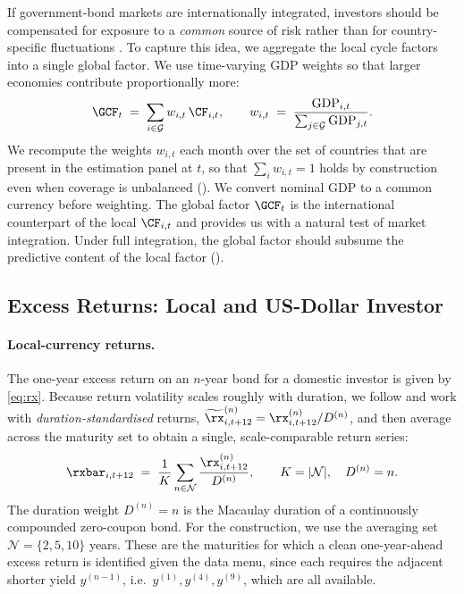 If government-bond markets are internationally integrated, investors should be
compensated for exposure to a \emph{common} source of risk rather than for
country-specific fluctuations \citep{dahlquist2013}. To capture this idea, we
aggregate the local cycle factors into a single global factor. We use
time-varying GDP weights so that larger economies contribute proportionally
more:
\begin{equation}
  \GCF_{t} \;=\; \sum_{i\in\mathcal{G}} w_{i,t}\,\CF_{i,t},
  \qquad
  w_{i,t} \;=\; \frac{\mathrm{GDP}_{i,t}}
                     {\sum_{j\in\mathcal{G}}\mathrm{GDP}_{j,t}}.
  \label{eq:gcf}
\end{equation}
We recompute the weights $w_{i,t}$ each month over the set of countries that
are present in the estimation panel at $t$, so that $\sum_{i}w_{i,t}=1$ holds
by construction even when coverage is unbalanced ().
We convert nominal GDP to a common currency before weighting. The global
factor $\GCF_{t}$ is the international counterpart of the local $\CF_{i,t}$ and
provides us with a natural test of market integration. Under full integration,
the global factor should subsume the predictive content of the local factor
().

\subsection{Excess Returns: Local and US-Dollar Investor}
\label{sec:fw-returns}

\paragraph{Local-currency returns.}
The one-year excess return on an $n$-year bond for a domestic investor is given
by \eqref{eq:rx}. Because return volatility scales roughly with duration, we
follow \citet{cieslak2015} and work with \emph{duration-standardised} returns,
$\widetilde{\rx}^{(n)}_{i,t+12}=\rx^{(n)}_{i,t+12}/D^{(n)}$, and then average
across the maturity set to obtain a single, scale-comparable return series:
\begin{equation}
  \rxbar_{i,t+12} \;=\; \frac{1}{K}\sum_{n\in\mathcal{N}}
                        \frac{\rx^{(n)}_{i,t+12}}{D^{(n)}},
  \qquad K=|\mathcal{N}|,\quad D^{(n)}=n.
  \label{eq:rxbar}
\end{equation}
The duration weight $D^{(n)}=n$ is the Macaulay duration of a continuously
compounded zero-coupon bond. For the construction, we use the averaging set
$\mathcal{N}=\{2,5,10\}$ years. These are the maturities for which a clean
one-year-ahead excess return is identified given the data menu, since each
requires the adjacent shorter yield $y^{(n-1)}$, i.e.\
$y^{(1)},y^{(4)},y^{(9)}$, which are all available.

